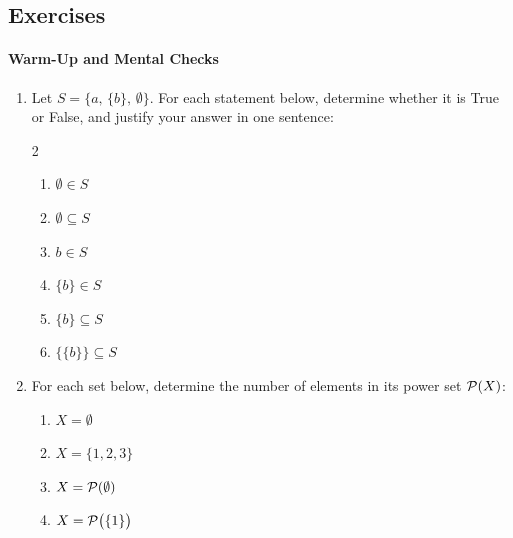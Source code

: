 \subsection{Exercises}

\paragraph{Warm-Up and Mental Checks}
\begin{enumerate}
\item Let $S = \{a, \, \{b\}, \, \emptyset\}$. For each statement below, determine whether it is True or False, and justify your answer in one sentence:
\begin{multicols}{2}
\begin{enumerate}[label=(\alph*)]
\item $\emptyset \in S$
\item $\emptyset \subseteq S$
\item $b \in S$
\item $\{b\} \in S$
\item $\{b\} \subseteq S$
\item $\{\{b\}\} \subseteq S$
\end{enumerate}
\end{multicols}

\item For each set below, determine the number of elements in its power set $\mathcal{P}(X)$:
\begin{enumerate}[label=(\alph*)]
\item $X = \emptyset$
\item $X = \{1, 2, 3\}$
\item $X = \mathcal{P}(\emptyset)$
\item $X = \mathcal{P}\bigl(\{1\}\bigr)$
\end{enumerate}
\end{enumerate}

